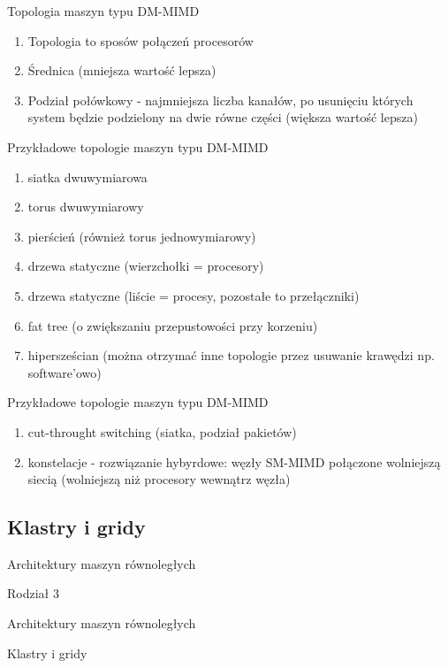 \documentclass{beamer}
\begin{document}
\begin{frame}{Topologia maszyn typu DM-MIMD}
  \begin{enumerate}
  \item Topologia to sposów połączeń procesorów
  \item Średnica (mniejsza wartość lepsza)
  \item Podział połówkowy - najmniejsza liczba kanałów, po usunięciu których system będzie podzielony na dwie równe części (większa wartość lepsza)
  \end{enumerate}
\end{frame}

\begin{frame}{Przykładowe topologie maszyn typu DM-MIMD}
  \begin{enumerate}
  \item siatka dwuwymiarowa
  \item torus dwuwymiarowy
  \item pierścień (również torus jednowymiarowy)
  \item drzewa statyczne (wierzchołki = procesory)
  \item drzewa statyczne (liście = procesy, pozostałe to przełączniki)
  \item fat tree (o zwiększaniu przepustowości przy korzeniu)
  \item hipersześcian (można otrzymać inne topologie przez usuwanie krawędzi np. software'owo)
  \end{enumerate}
\end{frame}

\begin{frame}{Przykładowe topologie maszyn typu DM-MIMD}
  \begin{enumerate}
  \item cut-throught switching (siatka, podział pakietów)
  \item konstelacje - rozwiązanie hybyrdowe: węzły SM-MIMD połączone wolniejszą siecią (wolniejszą niż procesory wewnątrz węzła)
  \end{enumerate}
\end{frame}

\subsection{Klastry i gridy}
\begin{frame}{Architektury maszyn równoległych}
  \huge
  \begin{center}
    Rodział 3

    Architektury maszyn równoległych

    \large

    Klastry i gridy
  \end{center}
\end{frame}
\end{document}
